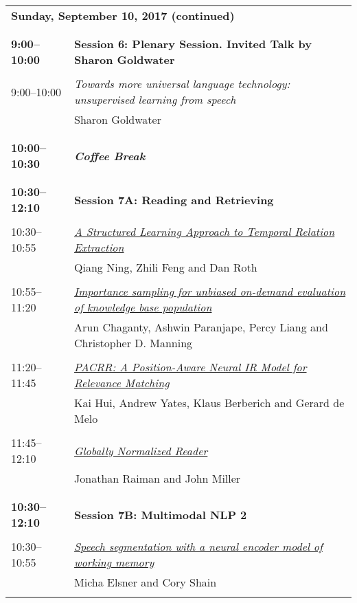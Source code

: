\newpage
\begin{tabular}{p{20mm}p{128mm}}
\\
\multicolumn{2}{l}{\bf Sunday, September 10, 2017 (continued)} \\\\
\\{\bf 9:00--10:00} & {\bf Session 6: Plenary Session. Invited Talk by Sharon Goldwater } \\
\\
9:00--10:00 & {\em Towards more universal language technology: unsupervised learning from speech}\\
         & Sharon Goldwater\\
\\
\\{\bf 10:00--10:30} & {\bf\em Coffee Break} \\
\\
\\{\bf 10:30--12:10} & {\bf Session 7A: Reading and Retrieving } \\
\\
10:30--10:55 & \hyperlink{page.1036}{\em A Structured Learning Approach to Temporal Relation Extraction}\\
         & Qiang Ning, Zhili Feng and Dan Roth \\
\\

10:55--11:20 & \hyperlink{page.1047}{\em Importance sampling for unbiased on-demand evaluation of knowledge base population}\\
         & Arun Chaganty, Ashwin Paranjape, Percy Liang and Christopher D. Manning \\
\\

11:20--11:45 & \hyperlink{page.1058}{\em PACRR: A Position-Aware Neural IR Model for Relevance Matching}\\
         & Kai Hui, Andrew Yates, Klaus Berberich and Gerard de Melo \\
\\

11:45--12:10 & \hyperlink{page.1068}{\em Globally Normalized Reader}\\
         & Jonathan Raiman and John Miller \\
\\

\\{\bf 10:30--12:10} & {\bf Session 7B: Multimodal NLP 2 } \\
\\
10:30--10:55 & \hyperlink{page.1079}{\em Speech segmentation with a neural encoder model of working memory}\\
         & Micha Elsner and Cory Shain \\
\\


\end{tabular}
